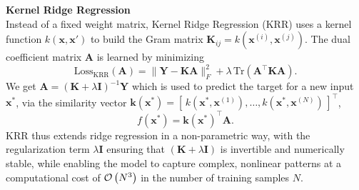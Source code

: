\textbf{Kernel Ridge Regression}\\ %
Instead of a fixed weight matrix, Kernel Ridge Regression (KRR) uses a kernel function $k(\mathbf{x}, \mathbf{x}')$ to build the Gram matrix $\mathbf{K}_{ij} = k(\mathbf{x}^{(i)}, \mathbf{x}^{(j)})$. The dual coefficient matrix $\mathbf{A}$ is learned by minimizing
\begin{equation}
\label{eq:kernel_ridge_loss}
\mathrm{Loss}_{\mathrm{KRR}}(\mathbf{A})
= \|\mathbf{Y} - \mathbf{K}\mathbf{A}\|_F^2 + \lambda\,\mathrm{Tr}(\mathbf{A}^\top \mathbf{K}\mathbf{A}).
\end{equation}
We get $\mathbf{A} = (\mathbf{K} + \lambda \mathbf{I})^{-1} \mathbf{Y}$ which is used to predict the target for a new input $\mathbf{x}^*$, via the similarity vector $\mathbf{k}(\mathbf{x}^*) = [\,k(\mathbf{x}^*,\mathbf{x}^{(1)}),\dots,k(\mathbf{x}^*,\mathbf{x}^{(N)})\,]^\top$,
\begin{equation}
\label{eq:kernel_ridge_predict}
f(\mathbf{x}^*) = \mathbf{k}(\mathbf{x}^*)^\top \mathbf{A}.
\end{equation}
KRR thus extends ridge regression in a non-parametric way, with the regularization term $\lambda \mathbf{I}$ ensuring that $(\mathbf{K} + \lambda \mathbf{I})$ is invertible and numerically stable, while enabling the model to capture complex, nonlinear patterns at a computational cost of $\mathcal{O}\left(N^3\right)$ in the number of training samples $N$.

